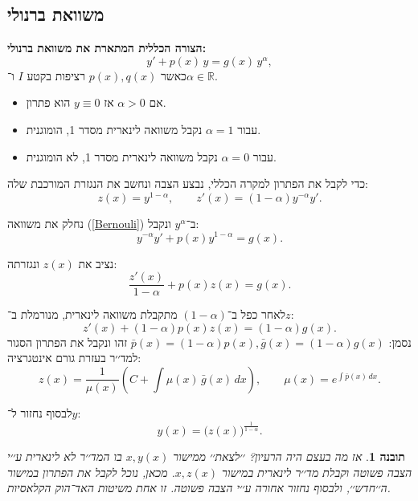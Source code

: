 \documentclass{article}
\numberwithin{equation}{section}
\newtheorem{insight}{תובנה}[section]
\begin{document}
\newpage
\subsection{משוואת ברנולי}

\textbf{הצורה הכללית המתארת את משוואת ברנולי:}
\begin{equation}\label{Bernouli}
y' + p(x)\,y = g(x)\,y^{\alpha}, 
\end{equation}
כאשר $p(x),q(x)$ רציפות בקטע $I$ ו־$\alpha \in \mathbb{R}$.

\begin{itemize}
  \item אם $\alpha>0$ אז $y\equiv 0$ הוא פתרון.
  \item עבור $\alpha=1$ נקבל משוואה לינארית מסדר 1, הומוגנית.
  \item עבור $\alpha=0$ נקבל משוואה לינארית מסדר 1, לא הומוגנית.
\end{itemize}


כדי לקבל את הפתרון למקרה הכללי, נבצע הצבה ונחשב את הנגזרת המורכבת שלה:
\[
z(x) = y^{1-\alpha}, \qquad z'(x) = (1-\alpha) y^{-\alpha} y'.
\]

נחלק את משוואה (\ref{Bernouli}) ב־$y^\alpha$ ונקבל:
\[
y^{-\alpha} y' + p(x) y^{1-\alpha} = g(x).
\]

נציב את $z(x)$ ונגזרתה:
\[
\frac{z'(x)}{1-\alpha} + p(x)z(x) = g(x).
\]

לאחר כפל ב־$(1-\alpha)$ מתקבלת משוואה לינארית, מנורמלת ב־$z$:
\begin{equation}
z'(x) + (1-\alpha)p(x)z(x) = (1-\alpha)g(x).
\end{equation}
נסמן: $\bar{p}(x)=(1-\alpha)p(x), \bar{g}(x)=(1-\alpha)g(x)$
זהו ונקבל את הפתרון הסגור למד׳׳ר בעזרת גורם אינטגרציה:
\begin{equation}
\boxed{z(x) = \frac{1}{\mu(x)} \left(C + \int \mu(x)\,\bar{g}(x)\,dx \right), 
\qquad 
\mu(x)=e^{\int \bar{p}(x)\,dx}}.
\end{equation}

לבסוף נחזור ל־$y$:
\begin{equation}
\boxed{y(x) = \Big(z(x)\Big)^{\tfrac{1}{1-\alpha}}}.
\end{equation}

\begin{insight}
אז מה בעצם היה הרעיון? ׳׳לצאת׳׳ ממישור $x,y(x)$ בו המד׳׳ר לא לינארית 
ע׳׳י הצבה פשוטה וקבלת מד׳׳ר לינארית במישור $x,z(x)$.  
מכאן, נוכל לקבל את הפתרון במישור ה׳׳חדש׳׳, ולבסוף נחזור אחורה ע׳׳י הצבה פשוטה.  
זו אחת משיטות האד־הוק הקלאסיות.
\end{insight}
\end{document}
